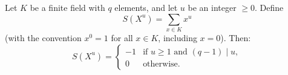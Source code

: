 Let $K$ be a finite field with $q$ elements, and let $u$ be an integer $\geq 0$. Define
$$S(X^u) = \sum_{x \in K} x^u$$
(with the convention $x^0 = 1$ for all $x \in K$, including $x = 0$). Then:
$$S(X^u) = \begin{cases}
-1 & \text{if } u \geq 1 \text{ and } (q-1) \mid u,\\
0  & \text{otherwise.}
\end{cases}$$
